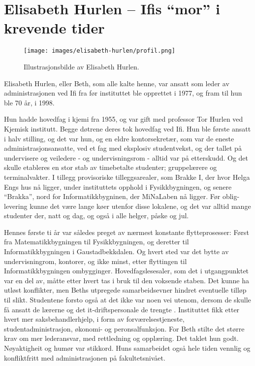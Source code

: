 \chapter[Elisabeth Hurlen]{Elisabeth Hurlen – Ifis ``mor'' i krevende tider}

\author{Skrevet av Narve Trædal}

\begin{wrapfigure}{l}{7cm}
	\centering
	\texttt{[image: images/elisabeth-hurlen/profil.png]}
	\label{fig:elisabeth-hurlen}
	\caption{Illustrasjonsbilde av Elisabeth Hurlen.}
\end{wrapfigure}

Elisabeth Hurlen, eller Beth, som alle kalte henne, var ansatt som leder av administrasjonen ved Ifi fra før instituttet ble opprettet i 1977, og fram til hun ble 70 år, i 1998.

Hun hadde hovedfag i kjemi fra 1955, og var gift med professor Tor Hurlen ved Kjemisk institutt. Begge døtrene deres tok hovedfag ved Ifi. Hun ble første ansatt i halv stilling, og det var hun, og en eldre kontorsekretær, som var de eneste administrasjonsansatte, ved et fag med eksplosiv studentvekst, og der tallet på undervisere og veiledere - og undervisningsrom - alltid var på etterskudd. Og det skulle etableres en stor stab av timebetalte studenter; gruppelærere og terminalvakter. I tillegg provisoriske tilleggsarealer, som Brakke I, der hvor Helga Engs hus nå ligger, under instituttets opphold i Fysikkbygningen, og senere ``Brakka'', nord for Informatikkbygninen, der MiNaLaben nå ligger. Før oblig-levering kunne det være lange køer utenfor disse lokalene, og det var alltid mange studenter der, natt og dag, og også i alle helger, påske og jul.

Hennes første ti år var således preget av nærmest konstante flytteprosesser: Først fra Matematikkbygningen til Fysikkbygningen, og deretter til Informatikkbygningen i Gaustadbekkdalen. Og hvert sted var det bytte av undervisningrom, kontorer, og ikke minst, etter flyttingen til Informatikkbygningen ombygginger. Hovedfagslesesaler, som det i utgangpunktet var en del av, måtte etter hvert tas i bruk til den voksende staben. Det kunne ha utløst konflikter, men Beths utpregede samarbeidsevner hindret eventuelle tilløp til slikt. Studentene forsto også at det ikke var noen vei utenom, dersom de skulle få ansatt de lærerne og det it-driftspersonale de trengte . Instituttet fikk etter hvert mer saksbehandlerhjelp, i form av forværelsestjeneste, studentadministrasjon, økonomi- og peronsalfunksjon. For Beth stilte det større krav om mer lederansvar, med rettledning og opplæring. Det taklet hun godt. Nøyaktigheit og humør var stikkord. Huns samarbeidet også hele tiden vennlig og konfliktfritt med administrasjonen på fakultetsnivået.

